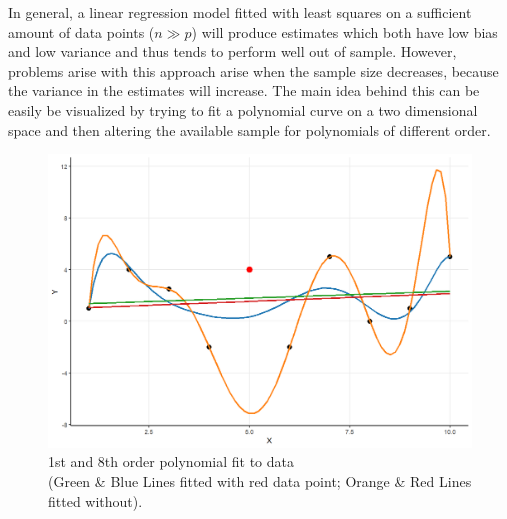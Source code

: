 \documentclass[12pt,a4paper]{article}
\begin{document}
In general, a linear regression model fitted with least squares on a sufficient amount of data points ($n \gg p$) will produce estimates which both have low bias and low variance and thus tends to perform well out of sample. However, problems arise with this approach arise when the sample size decreases, because the variance in the estimates will increase. The main idea behind this can be easily be visualized by trying to fit a polynomial curve on a two dimensional space and then altering the available sample for polynomials of different order. 
\begin{figure}
\centering
\includegraphics[scale=0.5]{PolynomialFit_Plot.png}
\caption{1st and 8th order polynomial fit to data \\ (\textcolor{green1}{Green} \& \textcolor{blue1}{Blue} Lines fitted with red data point; \textcolor{orange1}{Orange} \& \textcolor{red1}{Red} Lines fitted without).}
\label{fig:polyfit}
\end{figure}
\end{document}
